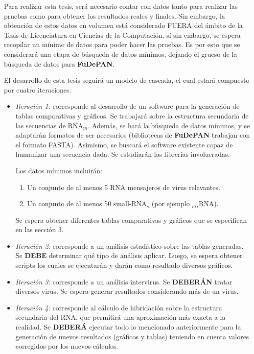 \documentclass[12pt,a4paper,spanish]{article}
\begin{document}
	\par Para realizar esta tesis, será necesario contar con datos tanto para realizar las pruebas como para obtener los resultados reales y finales.
	Sin embargo, la obtención de estos datos en volumen está considerado FUERA del ámbito de la Tesis de Licenciatura en Ciencias de la Computación, sí 	sin embargo, se espera recopilar un mínimo de datos para poder hacer las pruebas. Es por esto que se considerará una etapa de búsqueda de
	datos mínimos, dejando el grueso de la búsqueda de datos para \textbf{FuDePAN}. 
	\par El desarrollo de esta tesis seguirá un modelo de cascada, el cual estará compuesto por cuatro iteraciones. 
	\begin{itemize}
		\item \textit{Iteración 1:} corresponde al desarrollo de un software para la generación de tablas comparativas y 										gráficos. Se trabajará sobre la estructura secundaria de las secuencias de RNA$_m$. 									Además, se hará la búsqueda de datos mínimos, y se adaptarán formatos de ser 										necesarios (bibliotecas de \textbf{FuDePAN} trabajan con el formato FASTA). Asimismo, 										se buscará el software existente capaz de humanizar una secuencia dada. Se estudiarán 										las librerías involucradas.
									\par Los datos mínimos incluirán:
									\begin{enumerate}
										\item Un conjunto de al menos 5 RNA mensajeros de virus relevantes.
										\item Un conjunto de al menos 50 small-RNA$_s$ (por ejemplo $_m$$_i$RNA).
									\end{enumerate}
									\par Se espera obtener diferentes tablas comparativas y gráficos que se especifican en 										las sección 3. 

		\item \textit{Iteración 2:} corresponde a un análisis estadístico sobre las tablas generadas. Se \textbf{DEBE} 										determinar qué tipo de análisis aplicar. Luego, se espera obtener scripts los cuales 										se ejecutarán y darán como resultado diversos gráficos.

		\item \textit{Iteración 3:} corresponde a un análisis intervirus. Se \textbf{DEBERÁN} tratar diversos virus. Se 									espera generar resultados considerando más de un virus. 

		\item \textit{Iteración 4:} corresponde al cálculo de hibridación sobre la estructura secundaria del RNA, que 										permitirá una aproximación más exacta a la realidad. Se \textbf{DEBERÁ} ejecutar todo 										lo mencionado anteriormente para la generación de nuevos resultados (gráficos y 									tablas) teniendo en cuenta valores corregidos por los nuevos cálculos.
	\end{itemize}
\end{document}
